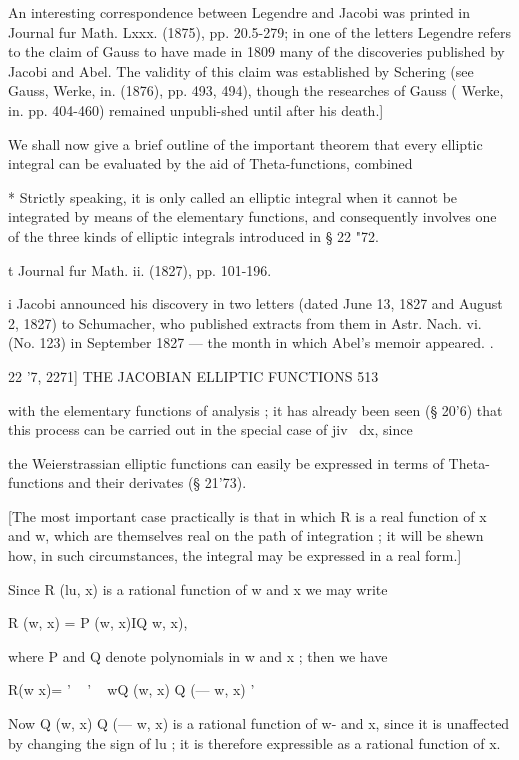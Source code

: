 An interesting correspondence between Legendre and Jacobi was printed in Journal fur 
Math. Lxxx. (1875), pp. 20.5-279; in one of the letters Legendre refers to the claim of 
Gauss to have made in 1809 many of the discoveries published by Jacobi and Abel. The 
validity of this claim was established by Schering (see Gauss, Werke, in. (1876), pp. 493, 
494), though the researches of Gauss ( Werke, in. pp. 404-460) remained unpubli-shed until 
after his death.] 

We shall now give a brief outline of the important theorem that every 
elliptic integral can be evaluated by the aid of Theta-functions, combined 

* Strictly speaking, it is only called an elliptic integral when it cannot be integrated by 
means of the elementary functions, and consequently involves one of the three kinds of elliptic 
integrals introduced in § 22 "72. 

t Journal fur Math. ii. (1827), pp. 101-196. 

i Jacobi announced his discovery in two letters (dated June 13, 1827 and August 2, 1827) to 
Schumacher, who published extracts from them in Astr. Nach. vi. (No. 123) in September 1827 — 
the month in which Abel's memoir appeared. . 



22 '7, 2271] THE JACOBIAN ELLIPTIC FUNCTIONS 513 

with the elementary functions of analysis ; it has already been seen (§ 20'6) 
that this process can be carried out in the special case of jiv~ dx, since 

the Weierstrassian elliptic functions can easily be expressed in terms of 
Theta-functions and their derivates (§ 21'73). 

[The most important case practically is that in which R is a real function of x and w, 
which are themselves real on the path of integration ; it will be shewn how, in such 
circumstances, the integral may be expressed in a real form.] 

Since R (lu, x) is a rational function of w and x we may write 

R (w, x) = P (w, x)IQ  w, x), 

where P and Q denote polynomials in w and x ; then we have 

R(w x)=    '     ~  '   
~ wQ (w, x) Q (— w, x) ' 

Now Q (w, x) Q (— w, x) is a rational function of w- and x, since it is 
unaffected by changing the sign of lu ; it is therefore expressible as a 
rational function of x. 


